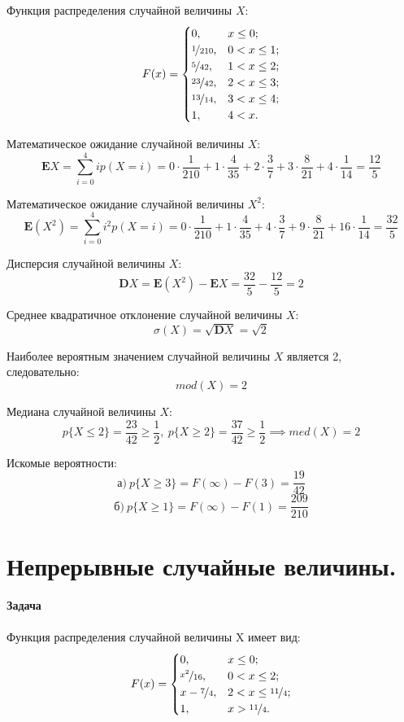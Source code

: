 \documentclass[fleqn, 10pt]{article}
\begin{document}
Функция распределения случайной величины \(X\):
\begin{equation}
  F(x)=\begin{cases}
  0, & x \leq 0;\\
  \nicefrac{1}{210}, & 0 < x \leq 1;\\
  \nicefrac{5}{42}, & 1 < x \leq 2;\\
  \nicefrac{23}{42}, & 2 < x \leq 3;\\
  \nicefrac{13}{14}, & 3 < x \leq 4;\\
  1, & 4 < x.
  \end{cases}
\end{equation}

Математическое ожидание случайной величины \(X\):
\[\textbf{E}X = \sum_{i=0}^4ip(X = i) = 0 \cdot \frac{1}{210} + 1 \cdot \frac{4}{35} + 2 \cdot \frac{3}{7} + 3 \cdot \frac{8}{21} + 4 \cdot \frac{1}{14} = \frac{12}{5} \]

Математическое ожидание случайной величины \(X^2\):
\[\textbf{E}\left(X^2\right) = \sum_{i=0}^4i^2p(X = i) = 0 \cdot \frac{1}{210} + 1 \cdot \frac{4}{35} + 4 \cdot \frac{3}{7} + 9 \cdot \frac{8}{21} + 16 \cdot \frac{1}{14} = \frac{32}{5}\]

Дисперсия случайной величины \(X\):
\[\textbf{D}X = \textbf{E}(X^2) - \textbf{E}X = \frac{32}{5} - \frac{12}{5} = 2\]

Среднее квадратичное отклонение случайной величины \(X\):
\[\sigma(X) = \sqrt{\textbf{D}X} = \sqrt{2}\]

Наиболее вероятным значением случайной величины \(X\) является 2, следовательно:
\[mod(X) = 2\]

Медиана случайной величины \(X\):
\[p\{X \leq 2\} = \frac{23}{42} \geq \frac{1}{2},\ p\{X \geq 2\} = \frac{37}{42} \geq \frac{1}{2} \implies med(X) = 2\]

Искомые вероятности:
\[\text{а)}\ p\{X \geq 3\} = F(\infty) - F(3) = \frac{19}{42} \]
\[\text{б)}\ p\{X \geq 1\} = F(\infty) - F(1)  = \frac{209}{210}\]
\newpage

\section{Непрерывные случайные величины.}
\paragraph{Задача}
Функция распределения случайной величины X имеет вид:
\begin{equation}
  F(x)=\begin{cases}
    0, & x\leq{0};\\
    \nicefrac{x^2}{16}, & 0 < x \leq{2};\\
    x-\nicefrac{7}{4}, & 2 < x \leq{\nicefrac{11}{4}};\\
    1, & x > \nicefrac{11}{4}.
  \end{cases}
\end{equation}
\end{document}
